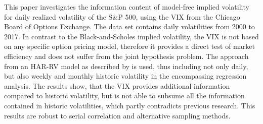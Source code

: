 
This paper investigates the information content of model-free implied volatility for daily realized volatility of the S\&P 500, using the \ac{VIX} from the Chicago Board of Options Exchange. The data set contains daily volatilities from 2000 to 2017. In contrast to the Black-and-Scholes implied volatility, the VIX is not based on any specific option pricing model, therefore it provides a direct test of market efficiency and does not suffer from the joint hypothesis problem. The approach from an HAR-RV model as described by \textcite{corsi2009} is used, thus including not only daily, but also weekly and monthly historic volatility in the encompassing regression analysis. The results show, that the VIX provides additional information compared to historic volatility, but is not able to subsume all the information contained in historic volatilities, which partly contradicts previous research. This results are robust to serial correlation and alternative sampling methods. 